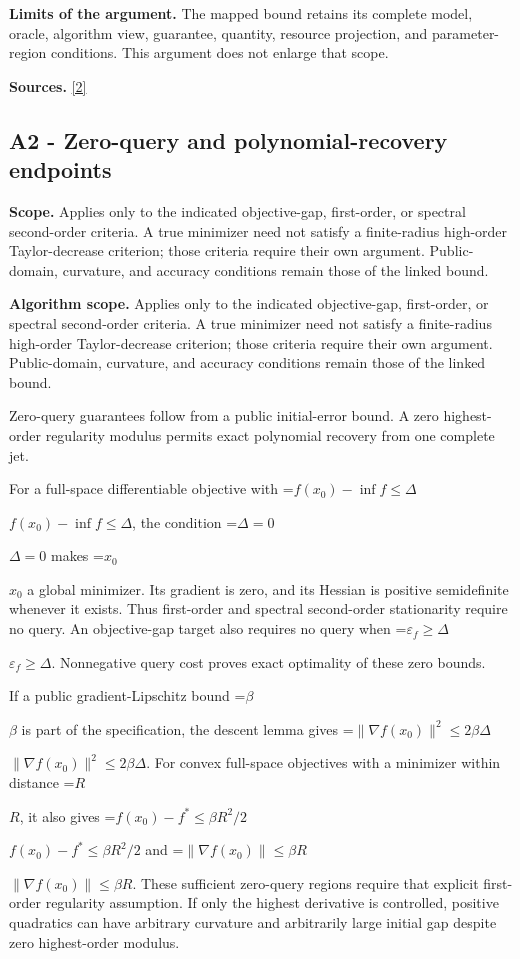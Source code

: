 \documentclass[10pt,a4paper]{article}
\newcommand{\AtlasMath}[1]{\par\begingroup\centering\setbox0=\hbox{$\displaystyle #1$}\ifdim\wd0>1.4\linewidth\typeout{ATLAS WIDE FORMULA: \the\wd0}\fi\ifdim\wd0>\linewidth\resizebox{\linewidth}{!}{\box0}\else\box0\fi\par\endgroup}
\newcommand{\AtlasInlineMath}[1]{\begingroup\setbox0=\hbox{$#1$}\ifdim\wd0>.4\linewidth\endgroup\AtlasMath{#1}\else\endgroup$#1$\fi}
\begin{document}
\textbf{Limits of the argument.} The mapped bound retains its complete model, oracle, algorithm view, guarantee, quantity, resource projection, and parameter-region conditions. This argument does not enlarge that scope.

\textbf{Sources.} \href{https://arxiv.org/html/2610.00345v1}{[2]}

\subsection{A2 - Zero-query and polynomial-recovery endpoints}
\textbf{Scope.} Applies only to the indicated objective-gap, first-order, or spectral second-order criteria. A true minimizer need not satisfy a finite-radius high-order Taylor-decrease criterion; those criteria require their own argument. Public-domain, curvature, and accuracy conditions remain those of the linked bound.

\textbf{Algorithm scope.} Applies only to the indicated objective-gap, first-order, or spectral second-order criteria. A true minimizer need not satisfy a finite-radius high-order Taylor-decrease criterion; those criteria require their own argument. Public-domain, curvature, and accuracy conditions remain those of the linked bound.

Zero-query guarantees follow from a public initial-error bound. A zero highest-order regularity modulus permits exact polynomial recovery from one complete jet.

For a full-space differentiable objective with \AtlasInlineMath{f(x_0)-\inf f\le\Delta}, the condition \AtlasInlineMath{\Delta=0} makes \AtlasInlineMath{x_0} a global minimizer. Its gradient is zero, and its Hessian is positive semidefinite whenever it exists. Thus first-order and spectral second-order stationarity require no query. An objective-gap target also requires no query when \AtlasInlineMath{\varepsilon_f\ge\Delta}. Nonnegative query cost proves exact optimality of these zero bounds.

If a public gradient-Lipschitz bound \AtlasInlineMath{\beta} is part of the specification, the descent lemma gives \AtlasInlineMath{\|\nabla f(x_0)\|^2\le2\beta\Delta}. For convex full-space objectives with a minimizer within distance \AtlasInlineMath{R}, it also gives \AtlasInlineMath{f(x_0)-f^*\le\beta R^2/2} and \AtlasInlineMath{\|\nabla f(x_0)\|\le\beta R}. These sufficient zero-query regions require that explicit first-order regularity assumption. If only the highest derivative is controlled, positive quadratics can have arbitrary curvature and arbitrarily large initial gap despite zero highest-order modulus.
\end{document}
